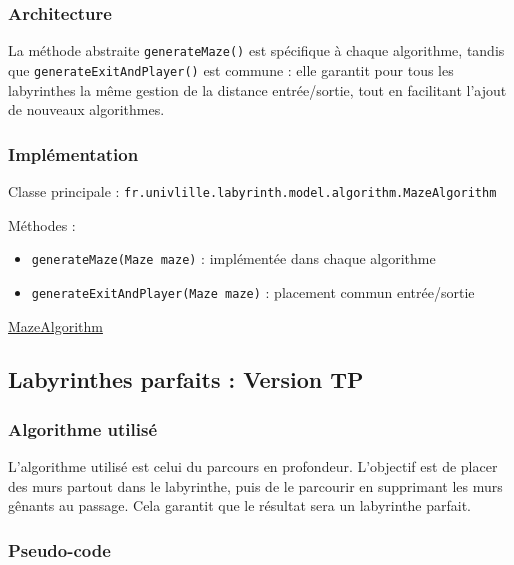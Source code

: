 \documentclass{butexFR}
\begin{document}
\subsubsection{Architecture}

La méthode abstraite \texttt{generateMaze()} est spécifique à chaque algorithme, tandis que \texttt{generateExitAndPlayer()} est commune : elle garantit pour tous les labyrinthes la même gestion de la distance entrée/sortie, tout en facilitant l’ajout de nouveaux algorithmes.

\subsubsection{Implémentation}

Classe principale : \texttt{fr.univlille.labyrinth.model.algorithm.MazeAlgorithm}

Méthodes :
\begin{itemize}
    \item \texttt{generateMaze(Maze maze)} : implémentée dans chaque algorithme
    \item \texttt{generateExitAndPlayer(Maze maze)} : placement commun entrée/sortie
\end{itemize}

\href{https://gitlab.univ-lille.fr/sae302/2025/G2_SAE3.3/-/blob/master/labyrinth/src/main/java/fr/univlille/labyrinth/model/algorithm/MazeAlgorithm.java?ref_type=heads}{MazeAlgorithm}

\newpage 

\subsection{Labyrinthes parfaits : Version TP}

\subsubsection{Algorithme utilisé}

L’algorithme utilisé est celui du parcours en profondeur. L’objectif est de placer des murs partout dans le labyrinthe, puis de le parcourir en supprimant les murs gênants au passage. Cela garantit que le résultat sera un labyrinthe parfait.

\newpage

\subsubsection{Pseudo-code}
\end{document}
